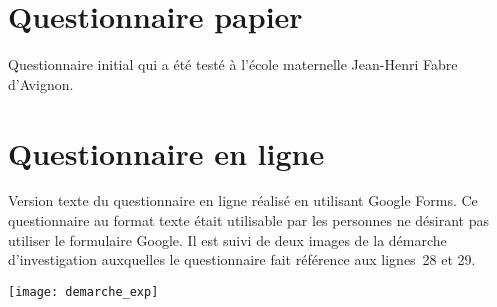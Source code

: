 \chapter{Questionnaire papier}
\label{questionnairePapier}
Questionnaire initial qui a été testé à l’école maternelle Jean-Henri Fabre d’Avignon.




\chapter{Questionnaire en ligne}
\label{questionnaireWeb}
Version texte du questionnaire en ligne réalisé en utilisant Google Forms. Ce questionnaire au format texte était utilisable par les personnes ne désirant pas utiliser le formulaire Google. Il est suivi de deux images de la démarche d’investigation auxquelles le questionnaire fait référence aux lignes~28 et 29.


\mbox{}
\vfill
\noindent\texttt{[image: demarche\_exp]}
\vfill
\newpage

